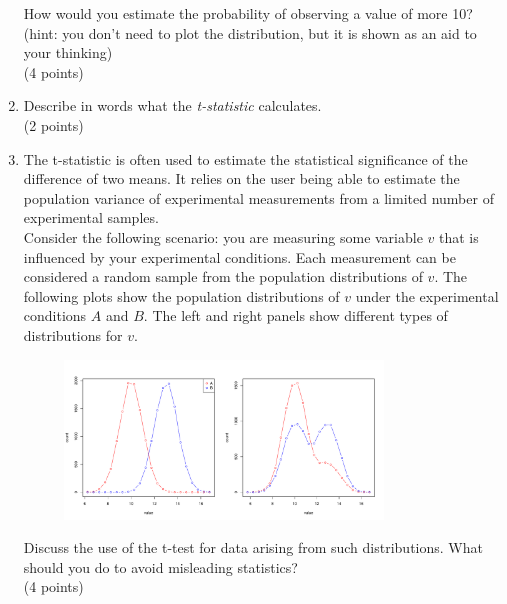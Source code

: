 \documentclass[11pt]{article}
\begin{document}
\begin{enumerate}
\begin{figure}[H]
  \end{figure}
  How would you estimate the probability of
  observing a value of more 10?\\
  (hint: you don't need to plot the distribution, but it is shown as an aid to
  your thinking)\\
  (4 points)
\item Describe in words what the \emph{t-statistic} calculates.\\
  (2 points)
\item The t-statistic is often used to estimate the statistical significance
  of the difference of two means. It relies on the user being able to estimate
  the population variance of experimental measurements from a limited number
  of experimental samples.\\
  Consider the following scenario: you are measuring
  some variable $v$ that is influenced by your experimental conditions. Each
  measurement can be considered a random sample from the population distributions of
  $v$. The following plots show the population distributions of $v$ under the
  experimental conditions $A$ and $B$. The left and right panels show
  different types of distributions for $v$. 
  \begin{figure}[H]
    \includegraphics[width=0.8\textwidth]{R/binorm}
  \end{figure}
  Discuss the use of the t-test for
  data arising from such distributions. What should you do to avoid misleading
  statistics?\\
  (4 points)
 

\end{enumerate}
\end{document}
